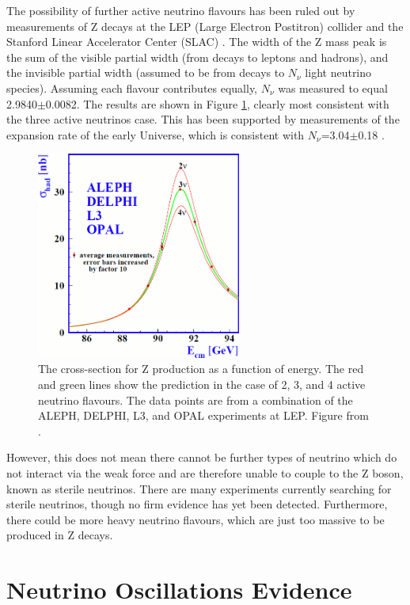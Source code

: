 The possibility of further active neutrino flavours has been ruled out by measurements of Z decays at the LEP (Large Electron Postitron) collider and the Stanford Linear Accelerator Center (SLAC) \cite{lepslac}. The width of the Z mass peak is the sum of the visible partial width (from decays to leptons and hadrons), and the invisible partial width (assumed to be from decays to $N_{\nu}$ light neutrino species). Assuming each flavour contributes equally, $N_{\nu}$ was measured to equal 2.9840$\pm$0.0082. The results are shown in Figure \ref{fig:zdecay}, clearly most consistent with the three active neutrinos case. This has been supported by measurements of the expansion rate of the early Universe, which is consistent with $N_{\nu}$=3.04$\pm$0.18 \cite{universalN}.

\begin{figure}
\centering
\includegraphics*[width=0.6\textwidth,clip]{figs/zdecay}
\caption{The cross-section for Z production as a function of energy. The red and green lines show the prediction in the case of 2, 3, and 4 active neutrino flavours. The data points are from a combination of the ALEPH, DELPHI, L3, and OPAL experiments at LEP. Figure from \cite{aleph}.} \label{fig:zdecay}
\end{figure}

However, this does not mean there cannot be further types of neutrino which do not interact via the weak force and are therefore unable to couple to the Z boson, known as sterile neutrinos. There are many experiments currently searching for sterile neutrinos, though no firm evidence has yet been detected. Furthermore, there could be more heavy neutrino flavours, which are just too massive to be produced in Z decays.

\section{Neutrino Oscillations Evidence}\label{sec:neutrinooscillationevidence}

